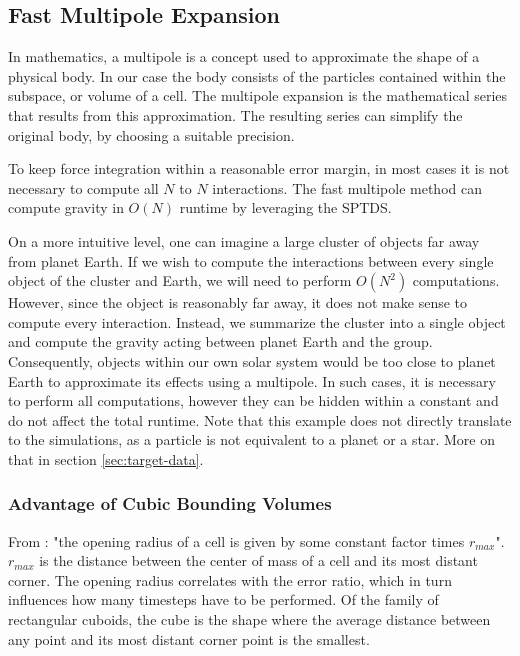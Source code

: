 \documentclass[]{article}
\begin{document}
\subsection{Fast Multipole Expansion} \label{sec:multipole}

In mathematics, a multipole is a concept used to approximate the shape of a physical body. In our case the body consists of the particles contained within the subspace, or volume of a cell. The multipole expansion is the mathematical series that results from this approximation. The resulting series can simplify the original body, by choosing a suitable precision.

To keep force integration within a reasonable error margin, in most cases it is not necessary to compute all $N$ to $N$ interactions. The fast multipole method can compute gravity in $O(N)$ runtime by leveraging the SPTDS. \cite{Stadel2001}

On a more intuitive level, one can imagine a large cluster of objects far away from planet Earth. If we wish to compute the interactions between every single object of the cluster and Earth, we will need to perform $O(N^2)$ computations. However, since the object is reasonably far away, it does not make sense to compute every interaction. Instead, we summarize the cluster into a single object and compute the gravity acting between planet Earth and the group. Consequently, objects within our own solar system would be too close to planet Earth to approximate its effects using a multipole. In such cases, it is necessary to perform all computations, however they can be hidden within a constant and do not affect the total runtime. 
Note that this example does not directly translate to the simulations, as a particle is not equivalent to a planet or a star. More on that in section \ref{sec:target-data}.


\subsubsection{Advantage of Cubic Bounding Volumes}\label{sec:cubic}

From \cite{Stadel2001}: "the opening radius of a cell is given by some constant factor times $r_{max}$". $r_{max}$ is the distance between the center of mass of a cell and its most distant corner. The opening radius correlates with the error ratio, which in turn influences how many timesteps have to be performed. Of the family of rectangular cuboids, the cube is the shape where the average distance between any point and its most distant corner point is the smallest. 
\end{document}
